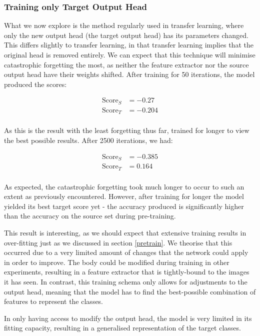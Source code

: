 \documentclass{report}
\newcommand{\SCORE}[2]{
	\begin{align*}
	\text{Score}_S &= #1 \\
	\text{Score}_T &= #2 \\
	\end{align*}
}
\begin{document}
	\subsubsection{Training only Target Output Head}
	What we now explore is the method regularly used in transfer learning, where only the new output head (the target output head) has its parameters changed. This differs slightly to transfer learning, in that transfer learning implies that the original head is removed entirely. We can expect that this technique will minimise catastrophic forgetting the most, as neither the feature extractor nor the source output head have their weights shifted. After training for 50 iterations, the model produced the scores:
	\SCORE{-0.27}{-0.204}
	As this is the result with the least forgetting thus far, trained for longer to view the best possible results. After 2500 iterations, we had:
	\SCORE{-0.385}{0.164}
	As expected, the catastrophic forgetting took much longer to occur to such an extent as previously encountered. However, after training for longer the model yielded its best target score yet - the accuracy produced is significantly higher than the accuracy on the source set during pre-training. \par
	This result is interesting, as we should expect that extensive training results in over-fitting just as we discussed in section \ref{pretrain}. We theorise that this occurred due to a very limited amount of changes that the network could apply in order to improve. The body could be modified during training in other experiments, resulting in a feature extractor that is tightly-bound to the images it has seen. In contrast, this training schema only allows for adjustments to the output head, meaning that the model has to find the best-possible combination of features to represent the classes. \par
	In only having access to modify the output head, the model is very limited in its fitting capacity, resulting in a generalised representation of the target classes. \par
\end{document}
